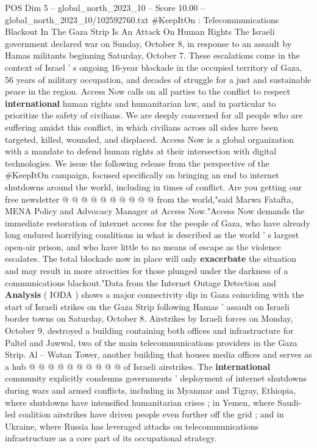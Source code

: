 \begin{textsample}{POS Dim 5 – global\_north\_2023\_10 – Score 10.00 – global\_north\_2023\_10/102592760.txt}  \label{ex:f5_pos_430}
\#KeepItOn : Telecommunications Blackout In The Gaza Strip Is An Attack On Human Rights The Israeli government declared war on Sunday, October 8, in response to an assault by Hamas militants beginning Saturday, October 7.
These escalations come in the context of Israel ' s ongoing 16-year blockade in the occupied territory of Gaza, 56 years of military occupation, and decades of struggle for a just and sustainable peace in the region.
Access Now calls on all parties to the conflict to respect \textbf{international} human rights and humanitarian law, and in particular to prioritize the safety of civilians.
We are deeply concerned for all people who are suffering amidst this conflict, in which civilians across all sides have been targeted, killed, wounded, and displaced.
Access Now is a global organization with a mandate to defend human rights at their intersection with digital technologies.
We issue the following release from the perspective of the \#KeepItOn campaign, focused specifically on bringing an end to internet shutdowns around the world, including in times of conflict.
Are you getting our free newsletter @ @ @ @ @ @ @ @ @ @ from the world,"said Marwa Fatafta, MENA Policy and Advocacy Manager at Access Now."Access Now demands the immediate restoration of internet access for the people of Gaza, who have already long endured horrifying conditions in what is described as the world ' s largest open-air prison, and who have little to no means of escape as the violence escalates.
The total blockade now in place will only \textbf{exacerbate} the situation and may result in more atrocities for those plunged under the darkness of a communications blackout."Data from the Internet Outage Detection and \textbf{Analysis} ( IODA ) shows a major connectivity dip in Gaza coinciding with the start of Israeli strikes on the Gaza Strip following Hamas ' assault on Israeli border towns on Saturday, October 8.
Airstrikes by Israeli forces on Monday, October 9, destroyed a building containing both offices and infrastructure for Paltel and Jawwal, two of the main telecommunications providers in the Gaza Strip.
Al -- Watan Tower, another building that houses media offices and serves as a hub @ @ @ @ @ @ @ @ @ @ of Israeli airstrikes.
The \textbf{international} community explicitly condemns governments ' deployment of internet shutdowns during wars and armed conflicts, including in Myanmar and Tigray, Ethiopia, where shutdowns have intensified humanitarian crises ; in Yemen, where Saudi-led coalition airstrikes have driven people even further off the grid ; and in Ukraine, where Russia has leveraged attacks on telecommunications infrastructure as a core part of its occupational strategy.

\end{textsample}
